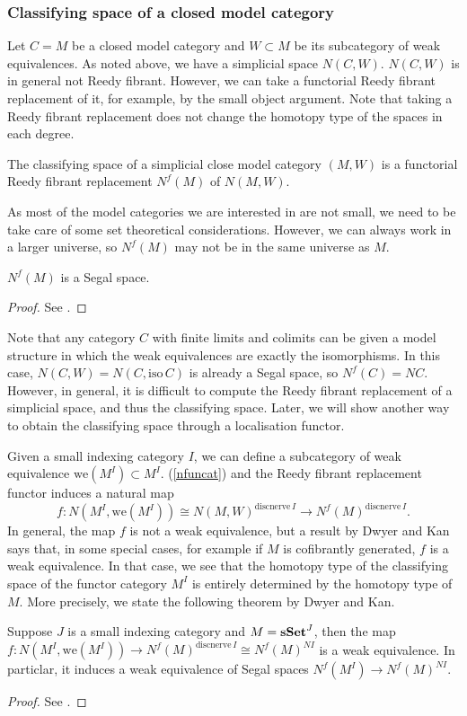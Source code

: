 \begin{refsection}
\subsubsection{Classifying space of a closed model category}
Let $C=M$ be a closed model category and $W\subset M$ be its subcategory of weak equivalences. As noted above, we have a simplicial space $N(C,W)$. $N(C,W)$ is in general not Reedy fibrant. However, we can take a functorial Reedy fibrant replacement of it, for example, by the small object argument. Note that taking a Reedy fibrant replacement does not change the homotopy type of the spaces in each degree.

\begin{defin}
The classifying space of a simplicial close model category $(M,W)$ is a functorial Reedy fibrant replacement $N^f(M)$ of $N(M,W)$.
\end{defin}

As most of the model categories we are interested in are not small, we need to be take care of some set theoretical considerations. However, we can always work in a larger universe, so $N^f(M)$ may not be in the same universe as $M$.

\begin{thm}
$N^f(M)$ is a Segal space.
\end{thm}
\begin{proof}
See \cite[Thm 8.3]{rezk}.
\end{proof}

Note that any category $C$ with finite limits and colimits can be given a model structure in which the weak equivalences are exactly the isomorphisms. In this case, $N(C,W)=N(C,\mathrm{iso}\,C)$ is already a Segal space, so $N^f(C)=NC$. However, in general, it is difficult to compute the Reedy fibrant replacement of a simplicial space, and thus the classifying space. Later, we will show another way to obtain the classifying space through a localisation functor.

Given a small indexing category $I$, we can define a subcategory of weak equivalence $\mathrm{we}(M^I)\subset M^I$. (\ref{nfuncat}) and the Reedy fibrant replacement functor induces a natural map
$$f:N(M^I,\mathrm{we}(M^I))\cong N(M,W)^{\mathrm{discnerve}\,I}\to N^f(M)^{\mathrm{discnerve}\,I}.$$
In general, the map $f$ is not a weak equivalence, but a result by Dwyer and Kan says that, in some special cases, for example if $M$ is cofibrantly generated, $f$ is a weak equivalence. In that case, we see that the homotopy type of the classifying space of the functor category $M^I$ is entirely determined by the homotopy type of $M$. More precisely, we state the following theorem by Dwyer and Kan.
\begin{thm}
Suppose $J$ is a small indexing category and $M=\mathbf{sSet}^J$, then the map $f:N(M^I,\mathrm{we}(M^I))\to N^f(M)^{\mathrm{discnerve}\,I}\cong N^f(M)^{NI}$ is a weak equivalence. In particlar, it induces a weak equivalence of Segal spaces $N^f(M^I)\to N^f(M)^{NI}$.
\end{thm}
\begin{proof}
See \cite[Thm 8.11]{rezk}.
\end{proof}


\end{refsection}
